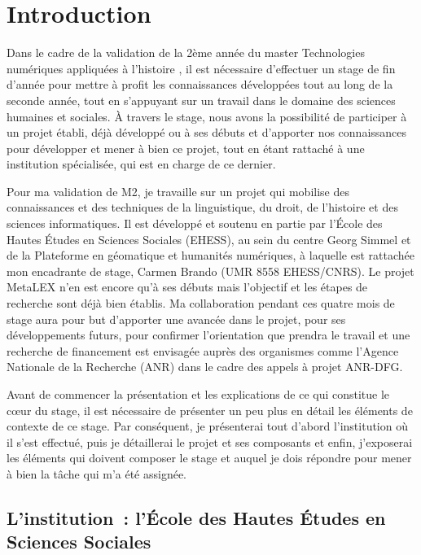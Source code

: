 \documentclass[a4paper,12pt, twoside]{book}
\begin{document}

\mainmatter
\part*{Introduction}
Dans le cadre de la validation de la 2ème année du master \og Technologies numériques appliquées à l'histoire \fg{}, il est nécessaire d'effectuer un stage de fin d'année pour mettre à profit les connaissances développées tout au long de la seconde année, tout en s'appuyant sur un travail dans le domaine des sciences humaines et sociales. À travers le stage, nous avons la possibilité de participer à un projet établi, déjà développé ou à ses débuts et d'apporter nos connaissances pour développer et mener à bien ce projet, tout en étant rattaché à une institution spécialisée, qui est en charge de ce dernier.

Pour ma validation de M2, je travaille sur un projet qui mobilise des connaissances et des techniques de la linguistique, du droit, de l'histoire et des sciences informatiques. Il est développé et soutenu en partie par l'École des Hautes Études en Sciences Sociales (EHESS), au sein du centre Georg Simmel et de la Plateforme en géomatique et humanités numériques, à laquelle est rattachée mon encadrante de stage, Carmen Brando (UMR 8558 EHESS/CNRS). Le projet MetaLEX n'en est encore qu'à ses débuts mais l'objectif et les étapes de recherche sont déjà bien établis. Ma collaboration pendant ces quatre mois de stage aura pour but d'apporter une avancée dans le projet, pour ses développements futurs, pour confirmer l'orientation que prendra le travail et une recherche de financement est envisagée auprès des organismes comme l'Agence Nationale de la Recherche (ANR) dans le cadre des appels à projet ANR-DFG.

Avant de commencer la présentation et les explications de ce qui constitue le cœur du stage, il est nécessaire de présenter un peu plus en détail les éléments de contexte de ce stage. Par conséquent, je présenterai tout d'abord l'institution où il s'est effectué, puis je détaillerai le projet et ses composants et enfin, j'exposerai les éléments qui doivent composer le stage et auquel je dois répondre pour mener à bien la tâche qui m'a été assignée.

\chapter{L'institution~: l'École des Hautes Études en Sciences Sociales}

\end{document}
